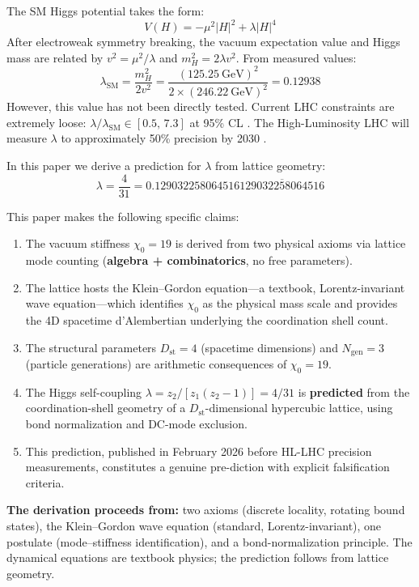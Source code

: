 \documentclass[12pt,a4paper]{article}
\newcommand{\chizero}{\chi_0}
\newcommand{\Dst}{D_{\mathrm{st}}}
\newcommand{\Ngen}{N_{\mathrm{gen}}}
\newcommand{\lambdaSM}{\lambda_{\mathrm{SM}}}
\begin{document}
The SM Higgs potential takes the form:
\begin{equation}
V(H) = -\mu^2 |H|^2 + \lambda |H|^4
\end{equation}
After electroweak symmetry breaking, the vacuum expectation value and Higgs mass are related by $v^2 = \mu^2/\lambda$ and $m_H^2 = 2\lambda v^2$. From measured values:
\begin{equation}
\lambdaSM = \frac{m_H^2}{2v^2} = \frac{(125.25\ \text{GeV})^2}{2 \times (246.22\ \text{GeV})^2} = 0.12938
\end{equation}
However, this value has not been directly tested. Current LHC constraints are extremely loose: $\lambda/\lambdaSM \in [0.5,\, 7.3]$ at 95\% CL \citep{ATLAS2022HH}. The High-Luminosity LHC will measure $\lambda$ to approximately 50\% precision by 2030 \citep{HLLHC2019}.

In this paper we derive a prediction for $\lambda$ from lattice geometry:
\begin{equation}\label{eq:prediction}
\boxed{\lambda = \frac{4}{31} = 0.129032258064516\overline{129032258064516}}
\end{equation}

This paper makes the following specific claims:
\begin{enumerate}
\item The vacuum stiffness $\chizero = 19$ is derived from two physical axioms via lattice mode counting (\textbf{algebra + combinatorics}, no free parameters).
\item The lattice hosts the Klein--Gordon equation---a textbook, Lorentz-invariant wave equation---which identifies $\chizero$ as the physical mass scale and provides the 4D spacetime d'Alembertian underlying the coordination shell count.
\item The structural parameters $\Dst = 4$ (spacetime dimensions) and $\Ngen = 3$ (particle generations) are arithmetic consequences of $\chizero = 19$.
\item The Higgs self-coupling $\lambda = z_2/[z_1(z_2-1)] = 4/31$ is \textbf{predicted} from the coordination-shell geometry of a $\Dst$-dimensional hypercubic lattice, using bond normalization and DC-mode exclusion.
\item This prediction, published in February 2026 before HL-LHC precision measurements, constitutes a genuine pre-diction with explicit falsification criteria.
\end{enumerate}

\textbf{The derivation proceeds from:} two axioms (discrete locality, rotating bound states), the Klein--Gordon wave equation (standard, Lorentz-invariant), one postulate (mode--stiffness identification), and a bond-normalization principle. The dynamical equations are textbook physics; the prediction follows from lattice geometry.
\end{document}
